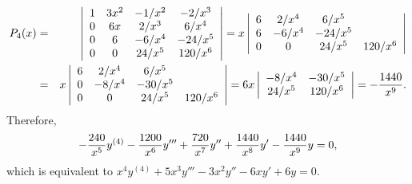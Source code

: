 \documentclass[dvips]{book}
\numberwithin{example}{section}
\numberwithin{equation}{section}
\numberwithin{theorem}{section}
\numberwithin{table}{section}
\numberwithin{figure}{section}
\begin{document}
\begin{eqnarray*}
P_4(x)&=&
\left|\begin{array}{cccc}
1&3x^2&-1/x^2&-2/x^3\\
0&6x&2/x^3&6/x^4\\
0&6&-6/x^4&-24/x^5\\0&0&24/x^5&120/x^6
\end{array}\right|=
x\left|\begin{array}{cccc}
6&2/x^4&6/x^5\\
6&-6/x^4&-24/x^5\\
0&0&24/x^5&120/x^6
\end{array}\right|\\
&=&x\left|\begin{array}{cccc}
6&2/x^4&6/x^5\\
0&-8/x^4&-30/x^5\\
0&0&24/x^5&120/x^6
\end{array}\right|
=6x\left|\begin{array}{cccc}
-8/x^4&-30/x^5\\
24/x^5&120/x^6
\end{array}\right|=-{1440\over x^9}.
\end{eqnarray*}
Therefore,
$$
-{240\over x^5}y^{(4)}-{1200\over x^6}y'''+{720\over
x^7}y''+{1440\over x^8}y'-{1440\over x^9}y=0,
$$
which is equivalent to
$x^4y^{(4)}+5x^3y'''-3x^2y''-6xy'+6y=0$.
\end{document}
